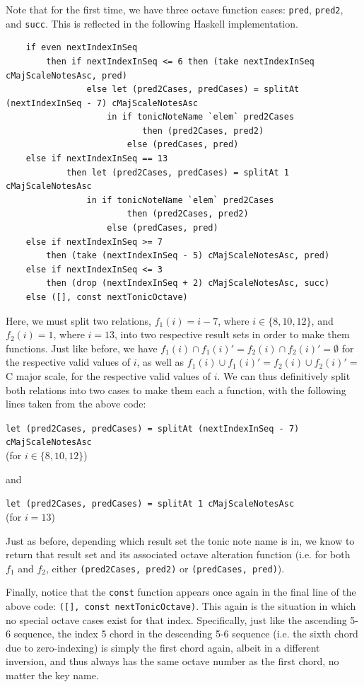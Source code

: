 \documentclass{report}
\begin{document}
Note that for the first time, we have three octave function cases: \verb.pred., \verb.pred2., and \verb.succ.. This is reflected in the following Haskell implementation.

\begin{verbatim}
    if even nextIndexInSeq 
        then if nextIndexInSeq <= 6 then (take nextIndexInSeq cMajScaleNotesAsc, pred)
                else let (pred2Cases, predCases) = splitAt (nextIndexInSeq - 7) cMajScaleNotesAsc
                    in if tonicNoteName `elem` pred2Cases 
                           then (pred2Cases, pred2) 
                        else (predCases, pred)
    else if nextIndexInSeq == 13
            then let (pred2Cases, predCases) = splitAt 1 cMajScaleNotesAsc
                in if tonicNoteName `elem` pred2Cases 
                        then (pred2Cases, pred2)
                    else (predCases, pred)
    else if nextIndexInSeq >= 7
        then (take (nextIndexInSeq - 5) cMajScaleNotesAsc, pred)
    else if nextIndexInSeq <= 3
        then (drop (nextIndexInSeq + 2) cMajScaleNotesAsc, succ)
    else ([], const nextTonicOctave) 
\end{verbatim}

Here, we must split two relations, $f_1(i) = i-7$, where $i \in \{8,10,12\}$, and $f_2(i) = 1$, where $i =13$, into two respective result sets in order to make them functions. Just like before, we have $f_1(i) \cap f_1(i)' = f_2(i) \cap f_2(i)' = \emptyset$ for the respective valid values of $i$, as well as $f_1(i) \cup f_1(i)' = f_2(i) \cup f_2(i)' =$ C major scale, for the respective valid values of $i$. We can thus definitively split both relations into two cases to make them each a function, with the following lines taken from the above code:

\noindent \verb.let (pred2Cases, predCases) = splitAt (nextIndexInSeq - 7) cMajScaleNotesAsc. \\(for $i \in \{8,10,12\}$)

\noindent and 

\noindent \verb.let (pred2Cases, predCases) = splitAt 1 cMajScaleNotesAsc. \\(for $i =13$)

Just as before, depending which result set the tonic note name is in, we know to return that result set and its associated octave alteration function (i.e. for both $f_1$ and $f_2$, either \verb.(pred2Cases, pred2). or \verb.(predCases, pred).).

Finally, notice that the \verb.const. function appears once again in the final line of the above code: \verb.([], const nextTonicOctave)..  This again is the situation in which no special octave cases exist for that index. Specifically, just like the ascending 5-6 sequence, the index 5 chord in the descending 5-6 sequence (i.e. the sixth chord due to zero-indexing) is simply the first chord again, albeit in a different inversion, and thus always has the same octave number as the first chord, no matter the key name.
\end{document}
